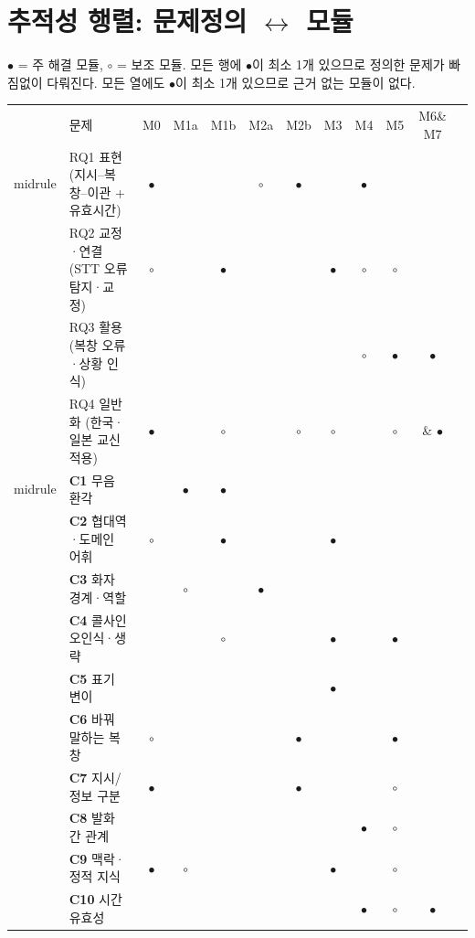 \documentclass[10pt,a4paper]{article}
\newcommand{\ch}[1]{\textbf{\textcolor{red!60!black}{#1}}}
\begin{document}
\section{추적성 행렬: 문제정의 $\leftrightarrow$ 모듈}\label{sec:trace}
$\bullet$ = 주 해결 모듈, $\circ$ = 보조 모듈. 모든 행에 $\bullet$이 최소 1개 있으므로 정의한 문제가 빠짐없이 다뤄진다. 모든 열에도 $\bullet$이 최소 1개 있으므로 근거 없는 모듈이 없다.

\begin{center}\small
\setlength{\tabcolsep}{5pt}
\begin{tabular}{@{}l l c c c c c c c c c c@{}}
\toprule
& 문제 & M0 & M1a & M1b & M2a & M2b & M3 & M4 & M5 & M6\& M7 \\midrule
\multirow{4}{*}{\rotatebox{90}{\scriptsize RQ}}
& RQ1 표현 (지시–복창–이관 + 유효시간) & $\bullet$ &  &  & $\circ$ & $\bullet$ &  & $\bullet$ &  & &  \\
& RQ2 교정·연결 (STT 오류 탐지·교정) & $\circ$ &  & $\bullet$ &  &  & $\bullet$ & $\circ$ & $\circ$ & &  \\
& RQ3 활용 (복창 오류·상황 인식) &  &  &  &  &  &  & $\circ$ & $\bullet$ & $\bullet$&  \\
& RQ4 일반화 (한국·일본 교신 적용) & $\bullet$ &  & $\circ$ &  & $\circ$ & $\circ$ &  & $\circ$ & \& $\bullet$ \\midrule
& \ch{C1} 무음 환각 &  & $\bullet$ & $\bullet$ &  &  &  &  &  & &  \\
& \ch{C2} 협대역·도메인 어휘 & $\circ$ &  & $\bullet$ &  &  & $\bullet$ &  &  & &  \\
& \ch{C3} 화자 경계·역할 &  & $\circ$ &  & $\bullet$ &  &  &  &  & &  \\
& \ch{C4} 콜사인 오인식·생략 &  &  & $\circ$ &  &  & $\bullet$ &  & $\bullet$ & &  \\
& \ch{C5} 표기 변이 &  &  &  &  &  & $\bullet$ &  &  & &  \\
& \ch{C6} 바꿔 말하는 복창 & $\circ$ &  &  &  & $\bullet$ &  &  & $\bullet$ & &  \\
& \ch{C7} 지시/정보 구분 & $\bullet$ &  &  &  & $\bullet$ &  &  & $\circ$ & &  \\
& \ch{C8} 발화 간 관계 &  &  &  &  &  &  & $\bullet$ & $\circ$ & &  \\
& \ch{C9} 맥락·정적 지식 & $\bullet$ & $\circ$ &  &  &  & $\bullet$ &  & $\circ$ & &  \\
& \ch{C10} 시간 유효성 &  &  &  &  &  &  & $\bullet$ & $\circ$ & $\bullet$&  \\

\end{tabular}
\end{center}
\end{document}
